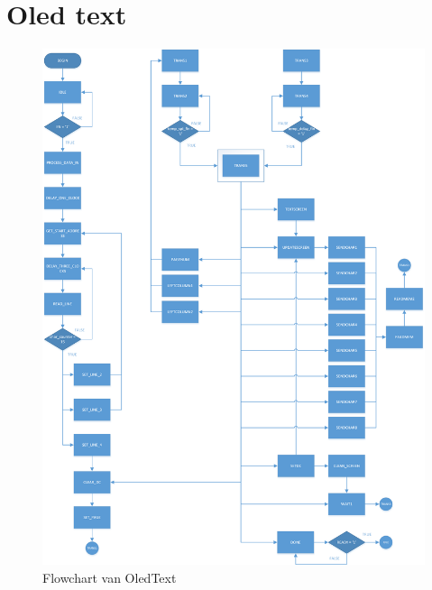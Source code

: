 \newpage
\section{Oled text}
\label{sec:appOledText}
	\begin{figure}[H]
		\centering
		\includegraphics[height=0.85\textheight]{Appendix/FlowCharts/OledText}
		\caption{Flowchart van OledText}
		\label{fig:FlowChartOledText}
	\end{figure}

\newpage
